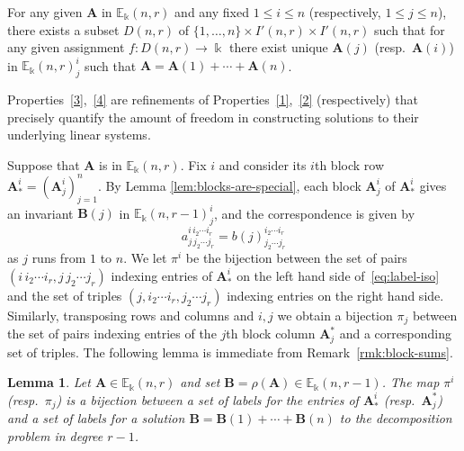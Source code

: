 \documentclass[10pt]{article}
\newtheorem{lemm}[theorem]{Lemma}
\theoremstyle{definition}
\providecommand{\resp}{resp.\ }
\newcommand{\E}{\mathbb{E}}
\newcommand{\bA}{\mathbf{A}}
\newcommand{\bB}{\mathbf{B}}
\begin{document}
\begin{property}\label{4}
 For any given $\bA$ in $\E_\Bbbk(n,r)$ and any fixed $1\le i \le n$
 \textup{(}respectively, $1 \le j \le n$\textup{)}, there exists a
 subset $D(n,r)$ of $\{1, \dots, n\} \times I'(n,r) \times I'(n,r)$
 such that for any given assignment $f: D(n,r) \to \Bbbk$ there exist
 unique $\bA(j)$ \textup{(}\resp $\bA(i)$\textup{)} in
 $\E_\Bbbk(n,r)^i_j$ such that $\bA = \bA(1) + \cdots + \bA(n)$.
\end{property}

Properties~\ref{3},~\ref{4} are refinements of
Properties~\ref{1},~\ref{2} (respectively) that precisely quantify the
amount of freedom in constructing solutions to their underlying linear
systems.

Suppose that $\bA$ is in $\E_\Bbbk(n,r)$. Fix $i$ and consider its
$i$th block row $\bA^i_* = (\bA^i_j)_{j=1}^n$. By Lemma
\ref{lem:blocks-are-special}, each block $\bA^i_j$ of $\bA^i_*$ gives
an invariant $\bB(j)$ in $\E_\Bbbk(n,r-1)^i_j$, and the correspondence
is given by
\begin{equation}\label{eq:label-iso}
 a^{i\, i_2 \cdots i_r}_{j\,j_2 \cdots j_r} = b(j)^{i_2 \cdots i_r}_{j_2 \cdots j_r}
\end{equation}
as $j$ runs from $1$ to $n$. We let $\pi^i$ be the bijection between
the set of pairs $(i\, i_2 \cdots i_r, j\,j_2 \cdots j_r)$ indexing
entries of $\bA^i_*$ on the left hand side of~\eqref{eq:label-iso} and
the set of triples $(j, i_2 \cdots i_r, j_2 \cdots j_r)$ indexing
entries on the right hand side. Similarly, transposing rows and
columns and $i,j$ we obtain a bijection $\pi_j$ between the set of
pairs indexing entries of the $j$th block column $\bA^*_j$ and a
corresponding set of triples. The following lemma is immediate from
Remark~\ref{rmk:block-sums}.


\begin{lemm}\label{lem:bijections}
Let $\bA \in \E_\Bbbk(n,r)$ and set $\bB = \rho(\bA) \in
\E_\Bbbk(n,r-1)$. The map $\pi^i$ \textup{(}\resp $\pi_j$\textup{)}
is a bijection between a set of labels for the entries of $\bA^i_*$
\textup{(}\resp $\bA^*_j$\textup{)} and a set of labels for a solution
$\bB = \bB(1)+ \cdots + \bB(n)$ to the decomposition problem in degree
$r-1$.
\end{lemm}
\end{document}
